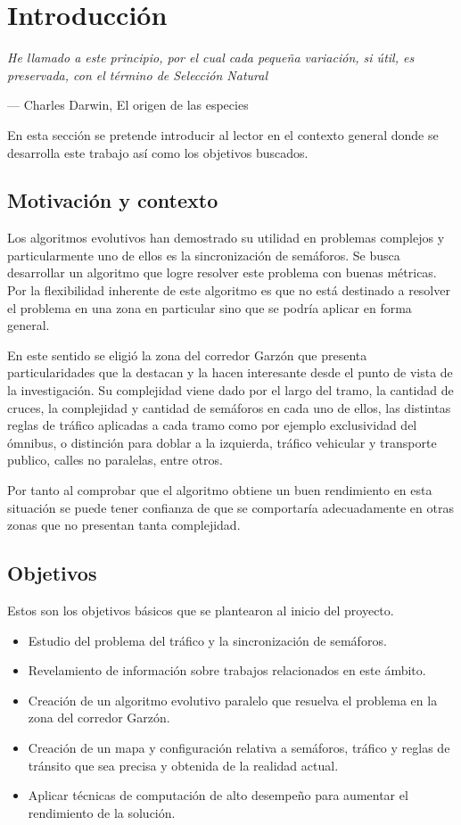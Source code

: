 \chapter{Introducción}
\epigraph{ \textit{He llamado a este principio, por el cual cada pequeña variación, si útil, es preservada, con el término de Selección Natural}}{--- Charles Darwin, El origen de las especies}

En esta sección se pretende introducir al lector en el contexto general donde se desarrolla este trabajo así como los objetivos buscados.

\section{Motivación y contexto}

Los algoritmos evolutivos han demostrado su utilidad en problemas complejos y particularmente uno de ellos es la sincronización de semáforos. Se busca desarrollar un algoritmo que logre resolver este problema con buenas métricas.
Por la flexibilidad inherente de este algoritmo es que no está destinado a resolver el problema en una zona en particular sino que se podría aplicar en forma general.

En este sentido se eligió la zona del corredor Garzón que presenta particularidades que la destacan y la hacen interesante desde el punto de vista de la investigación. Su complejidad viene dado por el largo del tramo, la cantidad de cruces, la complejidad y cantidad de semáforos en cada uno de ellos, las distintas reglas de tráfico aplicadas a cada tramo como por ejemplo exclusividad del ómnibus, o distinción para doblar a la izquierda, tráfico vehicular y transporte publico, calles no paralelas, entre otros.

Por tanto al comprobar que el algoritmo obtiene un buen rendimiento en esta situación se puede tener confianza de que se comportaría adecuadamente en otras zonas que no presentan tanta complejidad.



\newpage

\section{Objetivos}

Estos son los objetivos básicos que se plantearon al inicio del  proyecto.

\begin{itemize}
	\item Estudio del problema del tráfico y la sincronización de semáforos.
	\item Revelamiento de información sobre trabajos relacionados en este ámbito.
	\item Creación de un algoritmo evolutivo paralelo que resuelva el problema en la zona del corredor Garzón.
	\item Creación de un mapa y  configuración relativa a semáforos, tráfico y reglas de tránsito que sea precisa y obtenida de la realidad actual.	
	\item Aplicar técnicas de computación de alto desempeño para aumentar el rendimiento de la solución.

\end{itemize}

